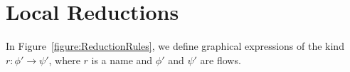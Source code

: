 \chapter{Local Reductions}

\begin{definition}\label{definition:FlowGraphicalExpressions}
In Figure~\vref{figure:ReductionRules}, we define graphical expressions of the kind $r\colon\phi'\to\psi'$, where $r$ is a name and $\phi'$ and $\psi'$ are flows.
\end{definition}


